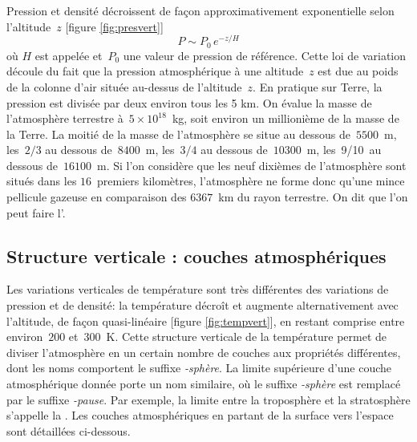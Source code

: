 
\sk
Pression et densité décroissent de façon approximativement exponentielle selon l'altitude~$z$ [figure \ref{fig:presvert}] $$ P\sim P_0 \, e^{-z/H} $$ où $H$ est appelée  et~$P_0$ une valeur de pression de référence. Cette loi de variation découle du fait que la pression atmosphérique à une altitude~$z$ est due au poids de la colonne d'air située au-dessus de l'altitude~$z$. En pratique sur Terre, la pression est divisée par deux environ tous les 5 km. On évalue la masse de l'atmosphère terrestre à~$5 \times 10^{18}$~kg, soit environ un millionième de la masse de la Terre. La moitié de la masse de l'atmosphère se situe au dessous de~$5500$~m, les~$2/3$ au dessous de~$8400$~m, les~$3/4$ au dessous de~$10300$~m, les~9/10~au dessous de~$16100$~m. Si l'on considère que les neuf dixièmes de l’atmosphère sont situés dans les $16$~premiers kilomètres, l’atmosphère ne forme donc qu'une mince pellicule gazeuse en comparaison des $6367$~km du rayon terrestre. On dit que l'on peut faire l'.

\sk
\subsection{Structure verticale : couches atmosphériques}

\sk
Les variations verticales de température sont très différentes des variations de pression et de densité: la température décroît et augmente alternativement avec l'altitude, de façon quasi-linéaire [figure \ref{fig:tempvert}], en restant comprise entre environ~$200$ et~$300$~K. Cette structure verticale de la température permet de diviser l'atmosphère en un certain nombre de couches aux propriétés différentes, dont les noms comportent le suffixe \emph{-sphère}. La limite supérieure d'une couche atmosphérique donnée porte un nom similaire, où le suffixe \emph{-sphère} est remplacé par le suffixe \emph{-pause}. Par exemple, la limite entre la troposphère et la stratosphère s'appelle la . Les couches atmosphériques en partant de la surface vers l'espace sont détaillées ci-dessous.

